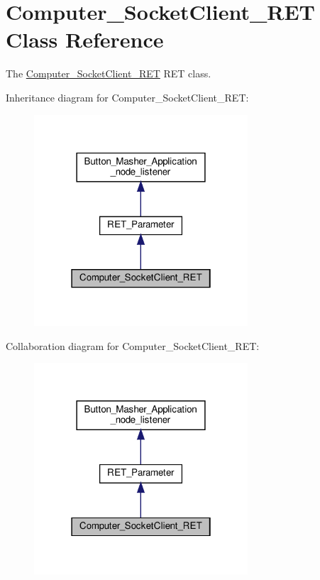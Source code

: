 \hypertarget{classRET__socket_1_1Computer__SocketClient__RET}{}\section{Computer\+\_\+\+Socket\+Client\+\_\+\+R\+ET Class Reference}
\label{classRET__socket_1_1Computer__SocketClient__RET}


The \hyperlink{classRET__socket_1_1Computer__SocketClient__RET}{Computer\+\_\+\+Socket\+Client\+\_\+\+R\+ET} R\+ET class.  




Inheritance diagram for Computer\+\_\+\+Socket\+Client\+\_\+\+R\+ET\+:
\nopagebreak
\begin{figure}[H]
\begin{center}
\leavevmode
\includegraphics[width=226pt]{classRET__socket_1_1Computer__SocketClient__RET__inherit__graph}
\end{center}
\end{figure}


Collaboration diagram for Computer\+\_\+\+Socket\+Client\+\_\+\+R\+ET\+:
\nopagebreak
\begin{figure}[H]
\begin{center}
\leavevmode
\includegraphics[width=226pt]{classRET__socket_1_1Computer__SocketClient__RET__coll__graph}
\end{center}
\end{figure}
